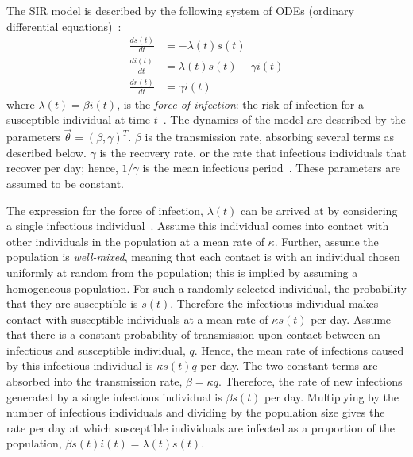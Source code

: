 \documentclass[thesis.tex]{subfiles}
\begin{document}
The SIR model is described by the following system of ODEs (ordinary differential equations)~\autocite[19]{keelingModeling}:
\begin{align}
\frac{ds(t)}{dt} &= -\lambda(t) s(t) \\
\frac{di(t)}{dt} &= \lambda(t) s(t) - \gamma i(t) \\
\frac{dr(t)}{dt} &= \gamma i(t)
\end{align}
where $\lambda(t) = \beta i(t)$, is the \emph{force of infection}: the risk of infection for a susceptible individual at time $t$~\autocite[17]{keelingModeling}.
The dynamics of the model are described by the parameters $\vec{\theta} = (\beta, \gamma)^T$.
$\beta$ is the transmission rate, absorbing several terms as described below.
$\gamma$ is the recovery rate, or the rate that infectious individuals that recover per day; hence, $1/\gamma$ is the mean infectious period~\autocite[367]{keelingModeling}.
These parameters are assumed to be constant.

The expression for the force of infection, $\lambda(t)$ can be arrived at by considering a single infectious individual~\autocite[214]{kretzschmarMathematical}.
Assume this individual comes into contact with other individuals in the population at a mean rate of $\kappa$.
Further, assume the population is \emph{well-mixed}, meaning that each contact is with an individual chosen uniformly at random from the population; this is implied by assuming a homogeneous population.
For such a randomly selected individual, the probability that they are susceptible is $s(t)$.
Therefore the infectious individual makes contact with susceptible individuals at a mean rate of $\kappa s(t)$ per day.
Assume that there is a constant probability of transmission upon contact between an infectious and susceptible individual, $q$.
Hence, the mean rate of infections caused by this infectious individual is $\kappa s(t) q$ per day.
The two constant terms are absorbed into the transmission rate, $\beta = \kappa q$.
Therefore, the rate of new infections generated by a single infectious individual is $\beta s(t)$ per day.
Multiplying by the number of infectious individuals and dividing by the population size gives the rate per day at which susceptible individuals are infected as a proportion of the population, $\beta s(t) i(t) = \lambda(t) s(t)$.
\end{document}
